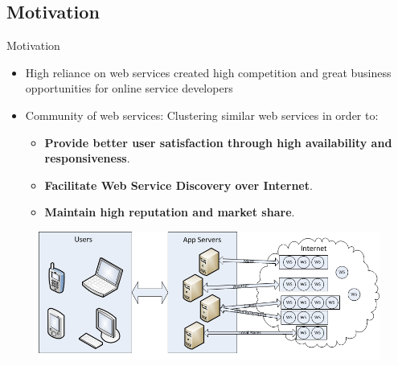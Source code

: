 \documentclass{beamer}
\begin{document}
\subsection{Motivation}
    \begin{frame}{Motivation}
    \begin{itemize}
        \item High reliance on web services created high competition and great business opportunities for online service developers
        \item Community of web services: Clustering similar web services in order to:
        \begin{itemize}
            \item \textbf{Provide better user satisfaction through high availability and responsiveness}.
            \item \textbf{Facilitate Web Service Discovery over Internet}.
            \item \textbf{Maintain high reputation and market share}.
        \end{itemize}
    \end{itemize}
    \begin{figure}[htbp]
        \centering
        \includegraphics[width=1.0 \columnwidth]{figures/wsinternet.png}
    \end{figure}
    \end{frame}


\end{document}
